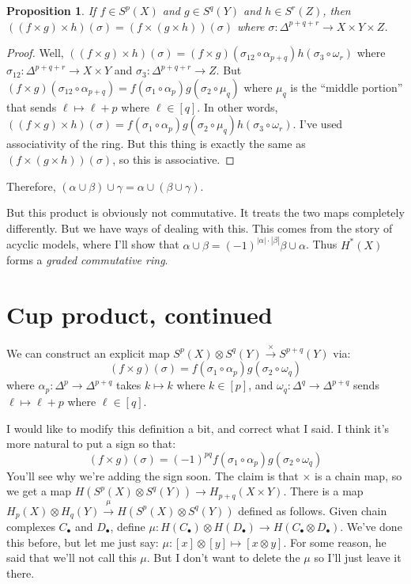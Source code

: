 \documentclass{amsart}
\theoremstyle{theorem}
\newtheorem{prop}[theorem]{Proposition}
\theoremstyle{definition}
\begin{document}
\begin{prop}
If $f\in S^p(X)$ and $g\in S^q(Y)$ and $h\in S^r(Z)$, then $((f\times g)\times h)(\sigma)=(f\times(g\times h))(\sigma)$ where $\sigma:\Delta^{p+q+r}\to X\times Y\times Z$.
\end{prop}
\begin{proof}
Well, $((f\times g)\times h)(\sigma)=(f\times g)(\sigma_{12}\circ\alpha_{p+q})h(\sigma_3\circ\omega_r)$ where $\sigma_{12}:\Delta^{p+q+r}\to X\times Y$ and $\sigma_3:\Delta^{p+q+r}\to Z$. But $(f\times g)(\sigma_{12}\circ\alpha_{p+q})=f(\sigma_1\circ\alpha_p)g(\sigma_2\circ\mu_q)$ where $\mu_q$ is the ``middle portion'' that sends $\ell\mapsto \ell+p$ where $\ell\in[q]$. In other words, $((f\times g)\times h)(\sigma)=f(\sigma_1\circ\alpha_p)g(\sigma_2\circ\mu_q)h(\sigma_3\circ\omega_r)$. I've used associativity of the ring. But this thing is exactly the same as $(f\times(g\times h))(\sigma)$, so this is associative.
\end{proof}
Therefore, $(\alpha\cup\beta)\cup\gamma=\alpha\cup(\beta\cup\gamma)$.

But this product is obviously not commutative. It treats the two maps completely differently. But we have ways of dealing with this. This comes from the story of acyclic models, where I'll show that $\alpha\cup\beta=(-1)^{|\alpha|\cdot|\beta|}\beta\cup\alpha$. Thus $ H^\ast(X)$ forms a \emph{graded commutative ring}.
\section{Cup product, continued}
We can construct an explicit map $S^p(X)\otimes S^q(Y)\xrightarrow{\times} S^{p+q}(Y)$ via:
\begin{equation*}
(f\times g)(\sigma)=f(\sigma_1\circ\alpha_p)g(\sigma_2\circ\omega_q)
\end{equation*}
where $\alpha_p:\Delta^p\to\Delta^{p+q}$ takes $k\mapsto k$ where $k\in[p]$, and $\omega_q:\Delta^q\to\Delta^{p+q}$ sends $\ell\mapsto \ell+p$ where $\ell\in[q]$.

I would like to modify this definition a bit, and correct what I said. I think it's more natural to put a sign so that:
\begin{equation*}
(f\times g)(\sigma)=(-1)^{pq}f(\sigma_1\circ\alpha_p)g(\sigma_2\circ\omega_q)
\end{equation*}
You'll see why we're adding the sign soon. The claim is that $\times$ is a chain map, so we get a map $ H(S^p(X)\otimes S^q(Y))\to H_{p+q}(X\times Y)$. There is a map $ H_p(X)\otimes H_q(Y)\xrightarrow{\mu} H(S^p(X)\otimes S^q(Y))$ defined as follows. Given chain complexes $C_\bullet$ and $D_\bullet$, define $\mu: H(C_\bullet)\otimes H(D_\bullet)\to H(C_\bullet\otimes D_\bullet)$. We've done this before, but let me just say: $\mu:[x]\otimes [y]\mapsto [x\otimes y]$. For some reason, he said that we'll not call this $\mu$. But I don't want to delete the $\mu$ so I'll just leave it there.
\end{document}
